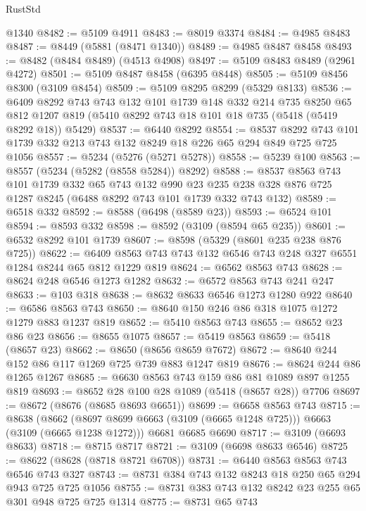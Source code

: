 \begin{lexlean}{RustStd}
\begin{coremodule}
    @1340
@8482 := @5109 @4911
@8483 := @8019 @3374
@8484 := @4985 @8483
@8487 := @8449 (@5881 (@8471 @1340))
@8489 := @4985 @8487 @8458
@8493 := @8482 (@8484 @8489) (@4513 @4908)
@8497 := @5109 @8483 @8489 (@2961 @4272)
@8501 := @5109 @8487 @8458 (@6395 @8448)
@8505 := @5109 @8456 @8300 (@3109 @8454)
@8509 := @5109 @8295 @8299 (@5329 @8133)
@8536 := @6409
    @8292
    @743
    @743
    @132
    @101
    @1739
    @148
    @332
    @214
    @735
    @8250
    @65
    @812
    @1207
    @819
    (@5410 @8292 @743 @18 @101 @18 @735 (@5418 (@5419 @8292 @18)) @5429)
@8537 := @6440 @8292
@8554 := @8537
    @8292
    @743
    @101
    @1739
    @332
    @213
    @743
    @132
    @8249
    @18
    @226
    @65
    @294
    @849
    @725
    @725
    @1056
@8557 := @5234 (@5276 (@5271 @5278))
@8558 := @5239 @100
@8563 := @8557 (@5234 (@5282 (@8558 @5284)) @8292)
@8588 := @8537
    @8563
    @743
    @101
    @1739
    @332
    @65
    @743
    @132
    @990
    @23
    @235
    @238
    @328
    @876
    @725
    @1287
    @8245
    (@6488 @8292 @743 @101 @1739 @332 @743 @132)
@8589 := @6518 @332
@8592 := @8588 (@6498 (@8589 @23))
@8593 := @6524 @101
@8594 := @8593 @332
@8598 := @8592 (@3109 (@8594 @65 @235))
@8601 := @6532 @8292 @101 @1739
@8607 := @8598 (@5329 (@8601 @235 @238 @876 @725))
@8622 := @6409 @8563 @743 @743 @132 @6546 @743 @248 @327 @6551 @1284 @8244 @65 @812 @1229 @819
@8624 := @6562 @8563 @743
@8628 := @8624 @248 @6546 @1273 @1282
@8632 := @6572 @8563 @743 @241 @247
@8633 := @103 @318
@8638 := @8632 @8633 @6546 @1273 @1280 @922
@8640 := @6586 @8563 @743
@8650 := @8640 @150 @246 @86 @318 @1075 @1272 @1279 @883 @1237 @819
@8652 := @5410 @8563 @743
@8655 := @8652 @23 @86 @23
@8656 := @8655 @1075
@8657 := @5419 @8563
@8659 := @5418 (@8657 @23)
@8662 := @8650 (@8656 @8659 @7672)
@8672 := @8640 @244 @152 @86 @117 @1269 @725 @739 @883 @1247 @819
@8676 := @8624 @244 @86 @1265 @1267
@8685 := @6630 @8563 @743 @159 @86 @81 @1089 @897 @1255 @819
@8693 := @8652 @28 @100 @28 @1089 (@5418 (@8657 @28)) @7706
@8697 := @8672 (@8676 (@8685 @8693 @6651))
@8699 := @6658 @8563 @743
@8715 := @8638
    (@8662 (@8697 @8699 @6663 (@3109 (@6665 @1248 @725))) @6663 (@3109 (@6665 @1238 @1272)))
    @6681
    @6685
    @6690
@8717 := @3109 (@6693 @8633)
@8718 := @8715 @8717
@8721 := @3109 (@6698 @8633 @6546)
@8725 := @8622 (@8628 (@8718 @8721 @6708))
@8731 := @6440 @8563 @8563 @743 @6546 @743 @327
@8743 := @8731 @384 @743 @132 @8243 @18 @250 @65 @294 @943 @725 @725 @1056
@8755 := @8731 @383 @743 @132 @8242 @23 @255 @65 @301 @948 @725 @725 @1314
@8775 := @8731
    @65
    @743

\end{coremodule}
\end{lexlean}
